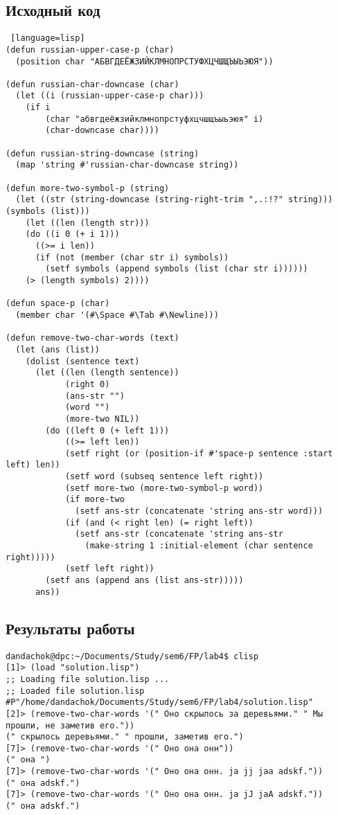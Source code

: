 \documentclass[12pt]{article}
\begin{document}
\subsection{Исходный код}
\begin{lstlisting} [language=lisp]
(defun russian-upper-case-p (char)
  (position char "АБВГДЕЁЖЗИЙКЛМНОПРСТУФХЦЧШЩЪЫЬЭЮЯ"))

(defun russian-char-downcase (char)
  (let ((i (russian-upper-case-p char)))
    (if i 
        (char "абвгдеёжзийклмнопрстуфхцчшщъыьэюя" i)
        (char-downcase char)))) 

(defun russian-string-downcase (string)
  (map 'string #'russian-char-downcase string))

(defun more-two-symbol-p (string)
  (let ((str (string-downcase (string-right-trim ",.:!?" string))) (symbols (list)))
    (let ((len (length str)))
    (do ((i 0 (+ i 1)))
      ((>= i len))
      (if (not (member (char str i) symbols))
        (setf symbols (append symbols (list (char str i))))))
    (> (length symbols) 2))))

(defun space-p (char)
  (member char '(#\Space #\Tab #\Newline)))

(defun remove-two-char-words (text)
  (let (ans (list))
    (dolist (sentence text)
      (let ((len (length sentence))
            (right 0) 
            (ans-str "")
            (word "")
            (more-two NIL))
        (do ((left 0 (+ left 1)))
            ((>= left len))
            (setf right (or (position-if #'space-p sentence :start left) len))
            (setf word (subseq sentence left right))
            (setf more-two (more-two-symbol-p word))
            (if more-two
              (setf ans-str (concatenate 'string ans-str word)))
            (if (and (< right len) (= right left))
              (setf ans-str (concatenate 'string ans-str 
                (make-string 1 :initial-element (char sentence right)))))
            (setf left right))
        (setf ans (append ans (list ans-str)))))
      ans))
\end{lstlisting}

\subsection{Результаты работы}
\begin{lstlisting}
dandachok@dpc:~/Documents/Study/sem6/FP/lab4$ clisp
[1]> (load "solution.lisp")
;; Loading file solution.lisp ...
;; Loaded file solution.lisp
#P"/home/dandachok/Documents/Study/sem6/FP/lab4/solution.lisp"
[2]> (remove-two-char-words '(" Оно скрылось за деревьями." " Мы прошли, не заметив его."))
(" скрылось деревьями." " прошли, заметив его.")
[7]> (remove-two-char-words '(" Оно она онн"))
(" она ")
[7]> (remove-two-char-words '(" Оно она онн. ja jj jaa adskf."))
(" она adskf.")
[7]> (remove-two-char-words '(" Оно она онн. ja jJ jaA adskf."))
(" она adskf.") 
\end{lstlisting}
\end{document}
